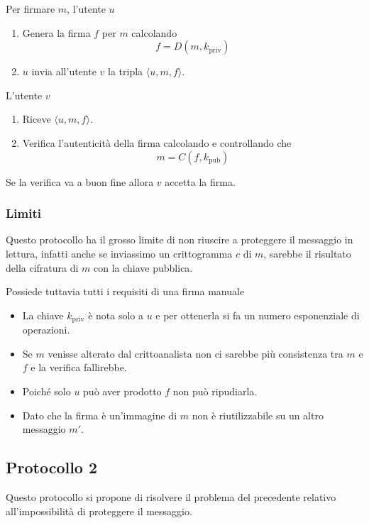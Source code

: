 Per firmare $m$, l'utente $u$
\begin{enumerate}
	\item Genera la firma $f$ per $m$ calcolando
	      \[ f = D(m, k_\text{priv}) \]
	\item $u$ invia all'utente $v$ la tripla $\langle u, m, f \rangle$.
\end{enumerate}
L'utente $v$
\begin{enumerate}
	\item Riceve $\langle u, m, f \rangle$.
	\item Verifica l'autenticit\`a della firma calcolando e controllando che
	      \[ m = C(f, k_\text{pub}) \]
\end{enumerate}
Se la verifica va a buon fine allora $v$ accetta la firma.

\subsubsection{Limiti}
Questo protocollo ha il grosso limite di non riuscire a proteggere il messaggio in lettura, infatti anche se
inviassimo un crittogramma $c$ di $m$, sarebbe il risultato della cifratura di $m$ con la chiave pubblica.

Possiede tuttavia tutti i requisiti di una firma manuale
\begin{itemize}
	\item La chiave $k_\text{priv}$ \`e nota solo a $u$ e per ottenerla si fa un numero esponenziale di operazioni.
	\item Se $m$ venisse alterato dal crittoanalista non ci sarebbe pi\`u consistenza tra $m$ e $f$ e la verifica
	      fallirebbe.
	\item Poich\'e solo $u$ pu\`o aver prodotto $f$ non pu\`o ripudiarla.
	\item Dato che la firma \`e un'immagine di $m$ non \`e riutilizzabile su un altro messaggio $m'$.
\end{itemize}

\subsection{Protocollo 2}
Questo protocollo si propone di risolvere il problema del precedente relativo all'impossibilit\`a di proteggere il
messaggio.

